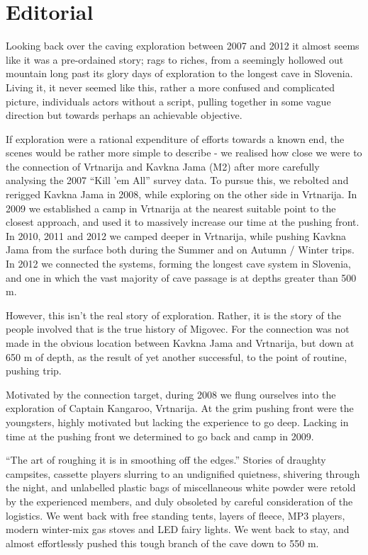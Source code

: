 \chapter*{Editorial}

Looking back over the caving exploration between 2007 and 2012 it almost
seems like it was a pre-ordained story; rags to riches, from a seemingly
hollowed out mountain long past its glory days of exploration to the
longest cave in Slovenia. Living it, it never seemed like this, rather a
more confused and complicated picture, individuals actors without a
script, pulling together in some vague direction but towards perhaps an
achievable objective.

If exploration were a rational expenditure of efforts towards a known
end, the scenes would be rather more simple to describe - we realised
how close we were to the connection of Vrtnarija and Kavkna Jama (M2)
after more carefully analysing the 2007 ``Kill 'em All'' survey data. To
pursue this, we rebolted and rerigged Kavkna Jama in 2008, while
exploring on the other side in Vrtnarija. In 2009 we established a camp
in Vrtnarija at the nearest suitable point to the closest approach, and
used it to massively increase our time at the pushing front. In 2010,
2011 and 2012 we camped deeper in Vrtnarija, while pushing Kavkna Jama
from the surface both during the Summer and on Autumn / Winter trips. In
2012 we connected the systems, forming the longest cave system in
Slovenia, and one in which the vast majority of cave passage is at
depths greater than 500 m.

However, this isn't the real story of exploration. Rather, it is the
story of the people involved that is the true history of Migovec. For
the connection was not made in the obvious location between Kavkna Jama
and Vrtnarija, but down at 650 m of depth, as the result of yet another
successful, to the point of routine, pushing trip.

Motivated by the connection target, during 2008 we flung ourselves into
the exploration of Captain Kangaroo, Vrtnarija. At the grim pushing
front were the youngsters, highly motivated but lacking the experience
to go deep. Lacking in time at the pushing front we determined to go
back and camp in 2009.

``The art of roughing it is in smoothing off the edges.'' Stories of
draughty campsites, cassette players slurring to an undignified
quietness, shivering through the night, and unlabelled plastic bags of
miscellaneous white powder were retold by the experienced members, and
duly obsoleted by careful consideration of the logistics. We went back
with free standing tents, layers of fleece, MP3 players, modern
winter-mix gas stoves and LED fairy lights. We went back to stay, and
almost effortlessly pushed this tough branch of the cave down to 550 m.

